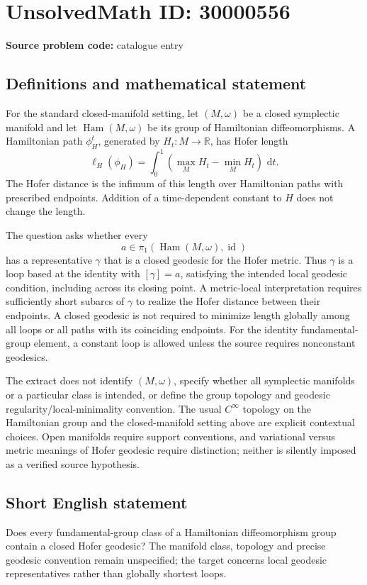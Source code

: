 \documentclass[11pt]{article}
\newcommand{\R}{\mathbb{R}}
\newcommand{\dd}{\,\mathrm{d}}
\begin{document}
\section*{UnsolvedMath ID: 30000556}
\textbf{Source problem code:} catalogue entry
\subsection{Definitions and mathematical statement}
For the standard closed-manifold setting, let $(M,\omega)$ be a closed symplectic manifold and let $\operatorname{Ham}(M,\omega)$ be its group of Hamiltonian diffeomorphisms. A Hamiltonian path $\phi_H^t$, generated by $H_t:M\to\R$, has Hofer length
\[
\ell_H(\phi_H)=\int_0^1\left(\max_M H_t-\min_M H_t\right)\,\dd t.
\]
The Hofer distance is the infimum of this length over Hamiltonian paths with prescribed endpoints. Addition of a time-dependent constant to $H$ does not change the length.

The question asks whether every
\[
a\in\pi_1(\operatorname{Ham}(M,\omega),\operatorname{id})
\]
has a representative $\gamma$ that is a closed geodesic for the Hofer metric. Thus $\gamma$ is a loop based at the identity with $[\gamma]=a$, satisfying the intended local geodesic condition, including across its closing point. A metric-local interpretation requires sufficiently short subarcs of $\gamma$ to realize the Hofer distance between their endpoints. A closed geodesic is not required to minimize length globally among all loops or all paths with its coinciding endpoints. For the identity fundamental-group element, a constant loop is allowed unless the source requires nonconstant geodesics.

The extract does not identify $(M,\omega)$, specify whether all symplectic manifolds or a particular class is intended, or define the group topology and geodesic regularity/local-minimality convention. The usual $C^\infty$ topology on the Hamiltonian group and the closed-manifold setting above are explicit contextual choices. Open manifolds require support conventions, and variational versus metric meanings of Hofer geodesic require distinction; neither is silently imposed as a verified source hypothesis.
\subsection{Short English statement}
Does every fundamental-group class of a Hamiltonian diffeomorphism group contain a closed Hofer geodesic? The manifold class, topology and precise geodesic convention remain unspecified; the target concerns local geodesic representatives rather than globally shortest loops.
\end{document}
